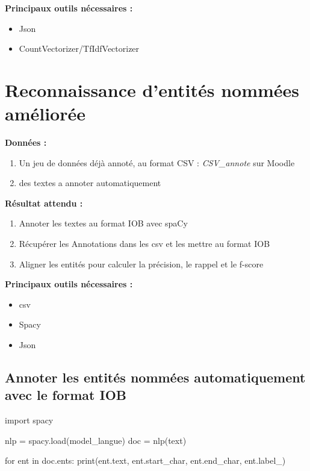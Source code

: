 \textbf{Principaux outils nécessaires :}
\begin{itemize}
  \item Json
  \item CountVectorizer/TfIdfVectorizer
\end{itemize}



\section{Reconnaissance d'entités nommées améliorée}
\textbf{Données :}
\begin{enumerate}
  \item Un jeu de données déjà annoté, au format CSV : \textit{CSV\_annote} sur Moodle
 \item des textes a annoter automatiquement 
\end{enumerate}

\textbf{Résultat attendu :}

\begin{enumerate}
  \item Annoter les textes au format IOB avec spaCy
  \item Récupérer les Annotations dans les csv et les mettre au format IOB
  \item Aligner les entités pour calculer la précision, le rappel et le f-score
\end{enumerate}   
  


\textbf{Principaux outils nécessaires :}
\begin{itemize}
  \item csv 
  \item Spacy
  \item Json
  
\end{itemize}



\vspace{0.5cm}
\subsection{Annoter les entités nommées automatiquement avec le format IOB}
\vspace{0.5cm}

\vspace{0.5cm}

\begin{python}
import spacy

nlp = spacy.load(model_langue)
doc = nlp(text)

for ent in doc.ents:
    print(ent.text, ent.start_char, ent.end_char, ent.label_)
\end{python}

